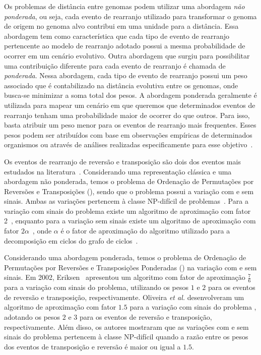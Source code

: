 
Os problemas de distância entre genomas podem utilizar uma abordagem \emph{não ponderada}, ou seja, cada evento de rearranjo utilizado para transformar o genoma de origem no genoma alvo contribui em uma unidade para a distância. Essa abordagem tem como característica que cada tipo de evento de rearranjo pertencente ao modelo de rearranjo adotado possui a mesma probabilidade de ocorrer em um cenário evolutivo. Outra abordagem que surgiu para possibilitar uma contribuição diferente para cada evento de rearranjo é chamada de \emph{ponderada}. Nessa abordagem, cada tipo de evento de rearranjo possui um peso associado que é contabilizado na distância evolutiva entre os genomas, onde busca-se minimizar a soma total dos pesos. A abordagem ponderada geralmente é utilizada para mapear um cenário em que queremos que determinados eventos de rearranjo tenham uma probabilidade maior de ocorrer do que outros. Para isso, basta atribuir um peso menor para os eventos de rearranjo mais frequentes. Esses pesos podem ser atribuídos com base em observações empíricas de determinados organismos ou através de análises realizadas especificamente para esse objetivo~\cite{2008-bader-etal,2001-eriksen}. 

Os eventos de rearranjo de reversão e transposição são dois dos eventos mais estudados na literatura~\cite{2002-berman-etal,2006-elias-hartman,2022-silva-etal}. Considerando uma representação clássica e uma abordagem não ponderada, temos o problema de Ordenação de Permutações por Reversões e Transposições (\SbRT), sendo que o problema possui a variação com e sem sinais. Ambas as variações pertencem à classe NP-difícil de problemas~\cite{2019b-oliveira-etal}. Para a variação com sinais do problema existe um algoritmo de aproximação com fator 2~\cite{1998-walter-etal}, enquanto para a variação sem sinais existe um algoritmo de aproximação com fator $2\alpha$~\cite{2008-rahman-etal}, onde $\alpha$ é o fator de aproximação do algoritmo utilizado para a decomposição em ciclos do grafo de ciclos~\cite{1999a-caprara,2013-chen}.

Considerando uma abordagem ponderada, temos o problema de Ordenação de Permutações por Reversões e Transposições Ponderadas (\SbWRT) na variação com e sem sinais. Em 2002, Eriksen~\cite{2002-eriksen} apresentou um algoritmo com fator de aproximação $\frac{7}{6}$ para a variação com sinais do problema, utilizando os pesos $1$ e $2$ para os eventos de reversão e transposição, respectivamente. Oliveira \textit{et al.}\cite{2019a-oliveira-etal} desenvolveram um algoritmo de aproximação com fator $1.5$ para a variação com sinais do problema \SbWRT{}, adotando os pesos $2$ e $3$ para os eventos de reversão e transposição, respectivamente. Além disso, os autores mostraram que as variações com e sem sinais do problema \SbWRT{} pertencem à classe NP-difícil quando a razão entre os pesos dos eventos de transposição e reversão é maior ou igual a $1.5$.  

